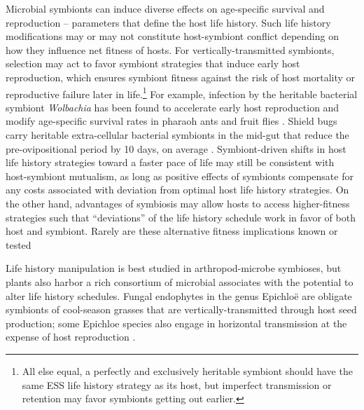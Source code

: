 \documentclass[11pt]{article}
\begin{document}
Microbial symbionts can induce diverse effects on age-specific survival and reproduction -- parameters that define the host life history. 
Such life history modifications may or may not constitute host-symbiont conflict depending on how they influence net fitness of hosts. 
For vertically-transmitted symbionts, selection may act to favor symbiont strategies that induce early host reproduction, which ensures symbiont fitness against the risk of host mortality or reproductive failure later in life.\footnote{All else equal, a perfectly and exclusively heritable symbiont should have the same ESS life history strategy as its host, but imperfect transmission or retention may favor symbionts getting out earlier.} 
For example, infection by the heritable bacterial symbiont \textit{Wolbachia} has been found to accelerate early host reproduction and modify age-specific survival rates in pharaoh ants \citep{singh2020wolbachia} and fruit flies \citep{fry2004variable}. 
Shield bugs carry heritable extra-cellular bacterial symbionts in the mid-gut that reduce the pre-ovipositional period by 10 days, on average \citep{karamipour2021removal}. 
Symbiont-driven shifts in host life history strategies toward a faster pace of life may still be consistent with host-symbiont mutualism, as long as positive effects of symbionts compensate for any costs associated with deviation from optimal host life history strategies. 
On the other hand, advantages of symbiosis may allow hosts to access higher-fitness strategies such that ``deviations'' of the life history schedule work in favor of both host and symbiont. 
Rarely are these alternative fitness implications known or tested \citep{karamipour2021removal}

Life history manipulation is best studied in arthropod-microbe symbioses, but plants also harbor a rich consortium of microbial associates with the potential to alter life history schedules. 
Fungal endophytes in the genus Epichlo\"{e} are obligate symbionts of cool-season grasses that are vertically-transmitted through host seed production; some Epichloe species also engage in horizontal transmission at the expense of host reproduction \citep{cheplick2009ecology,clay2002evolutionary}. 
\end{document}

